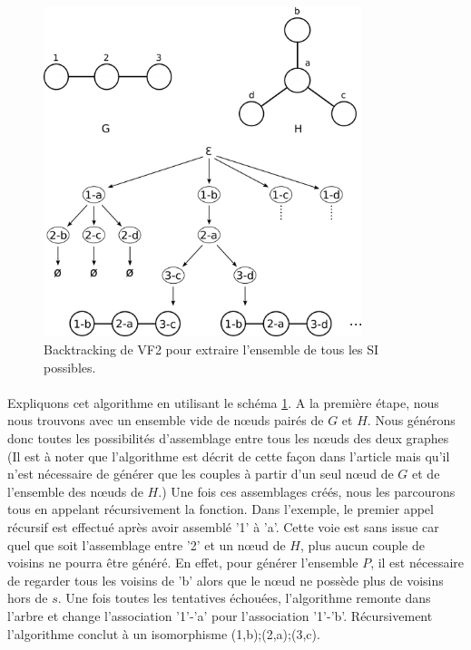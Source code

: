 \documentclass[12pt,french,twoside]{report}
\begin{document}
\begin{figure}[!ht]
  \begin{center}
    \includegraphics[width=350px]{Figures/s2m/recherche/VF2.png}
    \caption{\label{vf2}Backtracking de VF2 pour extraire l'ensemble de tous les SI possibles.}
  \end{center}
\end{figure}

\paragraph{}Expliquons cet algorithme en utilisant le schéma \ref{vf2}.
A la première étape, nous nous trouvons avec un ensemble vide de n\oe{}uds pairés de $G$ et $H$.
Nous générons donc toutes les possibilités d'assemblage entre tous les n\oe{}uds des deux graphes (Il est à noter que l'algorithme
est décrit de cette façon dans l'article mais qu'il n'est nécessaire de générer que les couples à partir d'un seul n\oe{}ud de $G$
et de l'ensemble des n\oe{}uds de $H$.)
Une fois ces assemblages créés, nous les parcourons tous en appelant récursivement la fonction.
Dans l'exemple, le premier appel récursif est effectué après avoir assemblé '1' à 'a'.
Cette voie est sans issue car quel que soit l'assemblage entre '2' et un n\oe{}ud de $H$, plus aucun couple de voisins ne pourra être
généré.
En effet, pour générer l'ensemble $P$, il est nécessaire de regarder tous les voisins de 'b' alors que le n\oe{}ud ne possède plus
de voisins hors de $s$.
Une fois toutes les tentatives échouées, l'algorithme remonte dans l'arbre et change l'association '1'-'a' pour l'association
'1'-'b'.
Récursivement l'algorithme conclut à un isomorphisme {(1,b);(2,a);(3,c)}.
\end{document}
